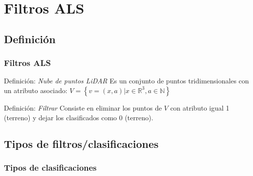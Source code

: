 \section{Filtros ALS}
\subsection{Definición}
\begin{frame}[label=filter_def]
    \frametitle{Filtros ALS}
    \begin{beamerboxesrounded}[shadow=true]{Definición: \emph{Nube de puntos LiDAR}}
     Es un conjunto de puntos tridimensionales con un atributo asociado: $V = \left\lbrace v=\left(x,a\right) | x \in \mathbb{R}^3, a \in \mathbb{N} \right\rbrace$
    \end{beamerboxesrounded}


    \begin{beamerboxesrounded}[shadow=true]{Definición: \emph{Filtrar}}
     Consiste en \alert<4>{eliminar} los puntos de $V$ con atributo igual 1 (terreno) y dejar los clasificados como 0 (terreno).
    \end{beamerboxesrounded}
\end{frame}
\subsection{Tipos de filtros/clasificaciones}
\begin{frame}
    \frametitle{Tipos de clasificaciones}
\end{frame}
